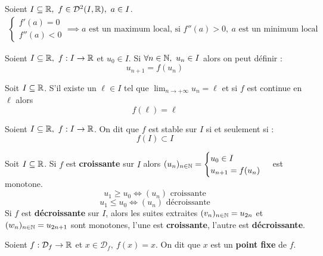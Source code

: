 \begin{proposition}
	Soient $I \subseteq \mathbb{R},\ f \in \mathcal{D}^2(I, \mathbb{R}),\ a \in I$.
	\begin{align*}
		\begin{cases}
			f'(a) = 0 \\
			f''(a) < 0
		\end{cases}
		\implies a \text{ est un maximum local, si } f''(a) > 0,\ a \text{  est un minimum local}
	\end{align*}
\end{proposition}

\begin{definition}
	Soient $I \subseteq \mathbb{R},\ f : I \to \mathbb{R}$ et $u_0 \in I$.
	Si $\forall n \in \mathbb{N},\ u_n \in I$ alors on peut définir :
	\[ u_{n + 1} = f(u_n) \]
\end{definition}

\begin{lemma}
	Soit $I \subseteq \mathbb{R}$. S'il existe un $\ell \in I$ tel que $\lim_{n \to +\infty} u_n = \ell$ et si $f$ est continue en $\ell$ alors 
	\[ f(\ell) = \ell \]
\end{lemma}

\begin{definition}
	Soient $I \subseteq \mathbb{R},\ f : I \to \mathbb{R}$. On dit que $f$ est stable sur $I$ si et seulement si : 
	\[ f(I) \subset I \]
\end{definition}

\begin{proposition}
	Soit $I \subseteq \mathbb{R}$.
	Si $f$ est \textbf{croissante} sur $I$ alors 
	$
	(u_n)_{n \in \mathbb{N}} = 
	\begin{cases}
		u_0 \in I \\
		u_{n + 1} = f(u_n)
	\end{cases}
	$
	est monotone.
	\[ u_1 \geq u_0 \iff (u_n) \text{ croissante} \]
	\[ u_1 \leq u_0 \iff (u_n) \text{ décroissante} \]
	Si $f$ est \textbf{décroissante} sur $I$, alors les suites extraites $(v_n)_{n \in \mathbb{N}} = u_{2n}$ et $(w_n)_{n \in \mathbb{N}} = u_{2n + 1}$ sont monotones, l'une est \textbf{croissante}, l'autre est \textbf{décroissante}.
\end{proposition}

\begin{definition}
	Soient $f : \mathcal{D}_f \to \mathbb{R}$ et $x \in \mathcal{D}_f,\ f(x) = x$. On dit que $x$ est un \textbf{point fixe} de $f$.
\end{definition}

